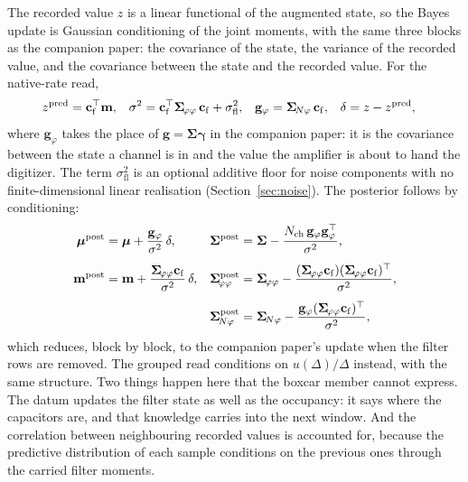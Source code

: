 \documentclass[11pt]{article}
\begin{document}
The recorded value $z$ is a linear functional of the augmented state, so
the Bayes update is Gaussian conditioning of the joint moments, with the
same three blocks as the companion paper: the covariance of the state, the
variance of the recorded value, and the covariance between the state and
the recorded value. For the native-rate read,
\begin{align}
  z^{\mathrm{pred}} &= \mathbf{c}_{\mathrm{f}}^{\top}\mathbf{m},
  &
  \sigma^2 &= \mathbf{c}_{\mathrm{f}}^{\top}\bm{\Sigma}_{\!\varphi\varphi}\,\mathbf{c}_{\mathrm{f}}
             + \sigma_{\mathrm{fl}}^2,
  &
  \mathbf{g}_{\varphi} &= \bm{\Sigma}_{\!N\varphi}\,\mathbf{c}_{\mathrm{f}},
  &
  \delta &= z - z^{\mathrm{pred}},
  \label{eq:threeblocks}
\end{align}
where $\mathbf{g}_{\varphi}$ takes the place of
$\mathbf{g} = \bm{\Sigma}\bm{\gamma}$ in the companion paper: it is the
covariance between the state a channel is in and the value the amplifier
is about to hand the digitizer. The term $\sigma_{\mathrm{fl}}^2$ is an
optional additive floor for noise components with no finite-dimensional
linear realisation (Section~\ref{sec:noise}). The posterior follows by
conditioning:
\begin{equation}
  \begin{aligned}
  \bm{\mu}^{\mathrm{post}}
    &= \bm{\mu} + \frac{\mathbf{g}_{\varphi}}{\sigma^2}\,\delta,
  &
  \bm{\Sigma}^{\mathrm{post}}
    &= \bm{\Sigma}
       - \frac{\Nch\,\mathbf{g}_{\varphi}\mathbf{g}_{\varphi}^{\top}}
              {\sigma^2},
  \\[4pt]
  \mathbf{m}^{\mathrm{post}}
    &= \mathbf{m}
       + \frac{\bm{\Sigma}_{\!\varphi\varphi}\cf}{\sigma^2}\,\delta,
  &
  \bm{\Sigma}_{\!\varphi\varphi}^{\mathrm{post}}
    &= \bm{\Sigma}_{\!\varphi\varphi}
       - \frac{(\bm{\Sigma}_{\!\varphi\varphi}\cf)
               (\bm{\Sigma}_{\!\varphi\varphi}\cf)^{\top}}{\sigma^2},
  \\[4pt]
  &
  &
  \bm{\Sigma}_{\!N\varphi}^{\mathrm{post}}
    &= \bm{\Sigma}_{\!N\varphi}
       - \frac{\mathbf{g}_{\varphi}
               (\bm{\Sigma}_{\!\varphi\varphi}\cf)^{\top}}{\sigma^2},
  \end{aligned}
  \label{eq:update}
\end{equation}
which reduces, block by block, to the companion paper's update when the
filter rows are removed. The grouped read conditions on $u(\Delta)/\Delta$
instead, with the same structure. Two things happen here that the boxcar
member cannot express. The datum updates the filter state as well as the
occupancy: it says where the capacitors are, and that knowledge carries
into the next window. And the correlation between neighbouring recorded
values is accounted for, because the predictive distribution of each
sample conditions on the previous ones through the carried filter moments.
\end{document}
